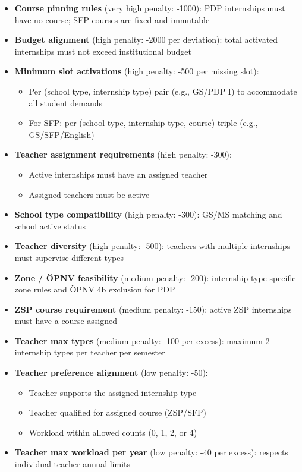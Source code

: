 \documentclass[12pt,a4paper]{report}
\begin{document}
\begin{itemize}
    \item \textbf{Course pinning rules} (very high penalty: -1000): PDP internships must have no course; SFP courses are fixed and immutable
    \item \textbf{Budget alignment} (high penalty: -2000 per deviation): total activated internships must not exceed institutional budget
    \item \textbf{Minimum slot activations} (high penalty: -500 per missing slot):
    \begin{itemize}
        \item Per (school type, internship type) pair (e.g., GS/PDP I) to accommodate all student demands
        \item For SFP: per (school type, internship type, course) triple (e.g., GS/SFP/English)
    \end{itemize}
    \item \textbf{Teacher assignment requirements} (high penalty: -300):
    \begin{itemize}
        \item Active internships must have an assigned teacher
        \item Assigned teachers must be active
    \end{itemize}
    \item \textbf{School type compatibility} (high penalty: -300): GS/MS matching and school active status
    \item \textbf{Teacher diversity} (high penalty: -500): teachers with multiple internships must supervise different types
    \item \textbf{Zone / ÖPNV feasibility} (medium penalty: -200): internship type-specific zone rules and ÖPNV 4b exclusion for PDP
    \item \textbf{ZSP course requirement} (medium penalty: -150): active ZSP internships must have a course assigned
    \item \textbf{Teacher max types} (medium penalty: -100 per excess): maximum 2 internship types per teacher per semester
    \item \textbf{Teacher preference alignment} (low penalty: -50):
    \begin{itemize}
        \item Teacher supports the assigned internship type
        \item Teacher qualified for assigned course (ZSP/SFP)
        \item Workload within allowed counts (0, 1, 2, or 4)
    \end{itemize}
    \item \textbf{Teacher max workload per year} (low penalty: -40 per excess): respects individual teacher annual limits
\end{itemize}
\end{document}

